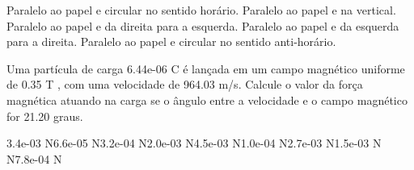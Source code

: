 \documentclass[12pt, addpoints]{exam}
\begin{document}
\begin{questions}
\begin{multicols*}{2}
\begin{choices}
\choice Paralelo ao papel e circular no sentido horário. 
\choice Paralelo ao papel e na vertical. 
\choice Paralelo ao papel e da direita para a esquerda. 
\choice Paralelo ao papel e da esquerda para a direita. 
\choice Paralelo ao papel e circular no sentido anti-horário. 
\end{choices}
\question Uma partícula de carga 6.44e-06 C é lançada em um campo magnético uniforme de    0.35 T , com uma velocidade de 964.03 m/s. Calcule o valor da força magnética atuando na carga se o ângulo entre a velocidade e o campo magnético for   21.20 graus.

\begin{oneparchoices}
\choice 3.4e-03 N\choice 6.6e-05 N\choice 3.2e-04 N\choice 2.0e-03 N\choice 4.5e-03 N\choice 1.0e-04 N\choice 2.7e-03 N\choice 1.5e-03 N N\choice 7.8e-04 N
\end{oneparchoices}\end{multicols*}
\end{questions}
\newpage
\end{document}
